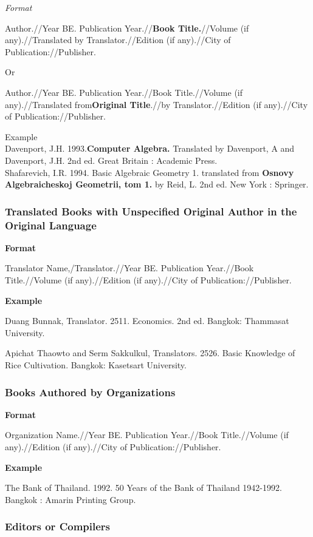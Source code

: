 \textit{Format}

Author.//Year BE. Publication Year.//\textbf{Book Title.}//Volume (if any).//Translated by Translator.//Edition (if any).//City of Publication://Publisher.

Or

Author.//Year BE. Publication Year.//Book Title.//Volume (if any).//Translated from\textbf{Original Title}.//by Translator.//Edition (if any).//City of Publication://Publisher.

Example\\
Davenport, J.H. 1993.\textbf{Computer Algebra.} Translated by Davenport, A and Davenport, J.H. 2nd ed. Great Britain : Academic Press.\\
Shafarevich, I.R. 1994. Basic Algebraic Geometry 1. translated from \textbf{Osnovy Algebraicheskoj Geometrii, tom 1.} by Reid, L. 2nd ed. New York : Springer.

\subsubsection{Translated Books with Unspecified Original Author in the Original Language}

\textbf{Format}

Translator Name,/Translator.//Year BE. Publication Year.//Book Title.//Volume (if any).//Edition (if any).//City of Publication://Publisher.

\textbf{Example}

Duang Bunnak, Translator. 2511. Economics. 2nd ed. Bangkok: Thammasat University.

Apichat Thaowto and Serm Sakkulkul, Translators. 2526. Basic Knowledge of Rice Cultivation. Bangkok: Kasetsart University.

\subsubsection{Books Authored by Organizations}

\textbf{Format}

Organization Name.//Year BE. Publication Year.//Book Title.//Volume (if any).//Edition (if any).//City of Publication://Publisher.

\textbf{Example}

The Bank of Thailand. 1992. 50 Years of the Bank of Thailand 1942-1992. Bangkok : Amarin Printing Group.

\subsubsection{Editors or Compilers}


